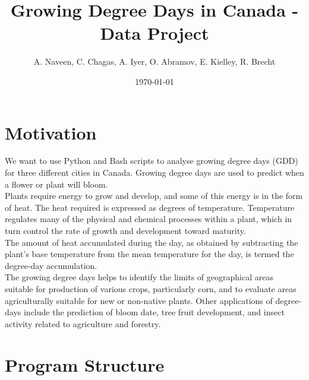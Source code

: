 \documentclass[12pt]{article}
\title{Growing Degree Days in Canada - Data Project}
\author{A. Naveen, C. Chagas, A. Iyer, O. Abramov, E. Kielley, R. Brecht}
\date{\today}
\begin{document}
\maketitle
\vspace{20pt}%
\tableofcontents
\pagebreak
\section{Motivation}
We want to use Python and Bash scripts to analyse growing degree days (GDD) for 
three different cities in Canada. Growing degree days are used to predict when a 
flower or plant will bloom. 
\\ Plants require energy to grow and develop, and some of this energy is in the 
form of heat. The heat required is expressed as degrees of temperature. 
Temperature regulates many of the physical and chemical processes within a 
plant, which in turn control the rate of growth and development toward maturity. 
\\The amount of heat accumulated during the day, as obtained by subtracting the
 plant's base temperature from the mean temperature for the day, is termed the
 degree-day accumulation.
\\The growing degree days helps to identify the limits of geographical areas 
suitable for production of various crops, particularly corn, and to evaluate 
areas agriculturally suitable for new or non-native plants. Other applications
of degree-days include the prediction of bloom date, tree fruit development, and
insect activity related to agriculture and forestry.


\pagebreak

\section{Program Structure}
\end{document}
